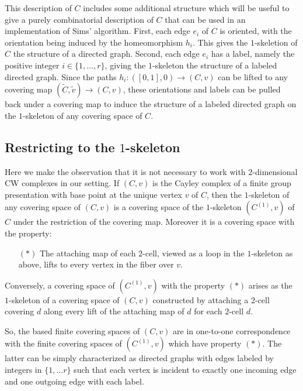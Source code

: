 \documentclass[12pt]{article}
\begin{document}
   This description of $C$ includes some additional structure which will be
   useful to give a purely combinatorial description of $C$ that can be used in
   an implementation of Sims' algorithm.  First, each edge $e_i$ of $C$ is
   oriented, with the orientation being induced by the homeomorphism $h_i$.
   This gives the $1$-skeletion of $C$ the structure of a directed graph.
   Second, each edge $e_i$ has a label, namely the positive integer
   $i\in\{1, \ldots, r\}$, giving the $1$-skeleton the structure of a labeled
   directed graph.  Since the paths $h_i:([0,1], 0)\to (C, v)$ can be lifted to
   any covering map $(\tilde C, \tilde v) \to (C, v)$, these orientations and
   labels can be pulled back under a covering map to induce the structure of a
   labeled directed graph on the $1$-skeleton of any covering space of $C$.
   
   \subsection{Restricting to the $1$-skeleton}

   Here we make the observation that it is not necessary to work with
   $2$-dimensional CW complexes in our setting. If $(C, v)$ is the Cayley
   complex of a finite group presentation with base point at the unique vertex
   $v$ of $C$, then the $1$-skeleton of any covering space of $(C, v)$ is a
   covering space of the $1$-skeleton $(C^{(1)}, v)$ of $C$ under the
   restriction of the covering map.  Moreover it is a covering space with the
   property:
   \begin{itemize}
   \item[$(\ast)$]  The attaching map of each $2$-cell, viewed as a loop in the
     $1$-skeleton as above, lifts to every vertex in the fiber over $v$.
   \end{itemize}
   Conversely, a covering space of $(C^{(1)}, v)$ with the property $(\ast)$
   arises as the $1$-skeleton of a covering space of $(C, v)$ constructed by
   attaching a $2$-cell covering $d$ along every lift of the attaching map of $d$
   for each $2$-cell $d$.

   So, the based finite covering spaces of $(C, v)$ are in one-to-one
   correspondence with the finite covering spaces of $(C^{(1)}, v)$ which have
   property $(\ast)$.  The latter can be simply characterized as directed graphs
   with edges labeled by integers in $\{1, \ldots r\}$ such that each vertex is
   incident to exactly one incoming edge and one outgoing edge with each label.
\end{document}
